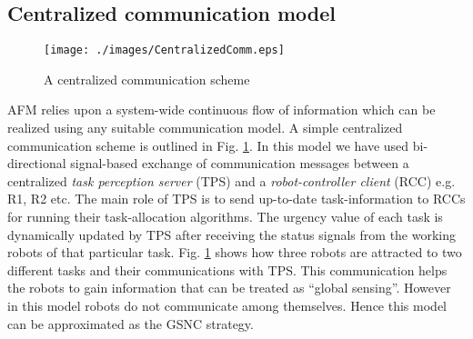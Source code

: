 \documentclass[journal]{IEEEtran}
\begin{document}
\subsection{Centralized communication model}
\begin{figure}
\centering
\texttt{[image: ./images/CentralizedComm.eps]}
\caption{\small A centralized communication scheme} %
\label{fig:ccm} %
\vspace*{-0.6cm}
\end{figure}
AFM relies upon a system-wide continuous flow of information which can be realized using any suitable communication model. A simple centralized communication scheme is outlined in Fig. \ref{fig:ccm}. In this model we have used bi-directional signal-based exchange of communication messages between a centralized \textit{task perception server} (TPS) and a \textit{robot-controller client} (RCC) e.g. R1, R2 etc. The main role of TPS is to send up-to-date task-information to RCCs for running their task-allocation algorithms. The urgency value of each task is dynamically updated  by TPS after receiving the  status signals from the working robots of that particular task. Fig. \ref{fig:ccm} shows how three robots are attracted to two different tasks and their communications with TPS. %
This communication helps the robots to gain information that can be  treated as ``global sensing''. However in this model  robots do not communicate among themselves. Hence this model can be approximated as the GSNC strategy.
\end{document}
